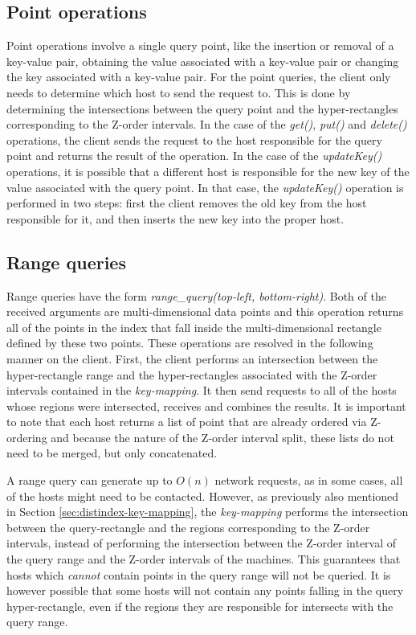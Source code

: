 \documentclass[11pt,a4paper]{globis-book}
\begin{document}
\subsection{Point operations}
Point operations involve a single query point, like the insertion or removal of a key-value pair, obtaining the value associated with a key-value pair or changing the key associated with a key-value pair. For the point queries, the client only needs to determine which host to send the request to. This is done by determining the intersections between the query point and the hyper-rectangles corresponding to the Z-order intervals. In the case of the \textit{get()}, \textit{put()} and \textit{delete()} operations, the client sends the request to the host responsible for the query point and returns the result of the operation. In the case of the \textit{updateKey()} operations, it is possible that a different host is responsible for the new key of the value associated with the query point. In that case, the \textit{updateKey()} operation is performed in two steps: first the client removes the old key from the host responsible for it, and then inserts the new key into the proper host.

\subsection{Range queries}

Range queries have the form \textit{range\_query(top-left, bottom-right)}. Both of the received arguments are multi-dimensional data points and this operation returns all of the points in the index that fall inside the multi-dimensional rectangle defined by these two points. These operations are resolved in the following manner on the client. First, the client performs an intersection between the hyper-rectangle range and the hyper-rectangles associated with the Z-order intervals contained in the \textit{key-mapping}. It then send requests to all of the hosts whose regions were intersected, receives and combines the results. It is important to note that each host returns a list of point that are already ordered via Z-ordering and because the nature of the Z-order interval split, these lists do not need to be merged, but only concatenated.

A range query can generate up to $O(n)$ network requests, as in some cases, all of the hosts might need to be contacted. However, as previously also mentioned in Section \ref{sec:distindex-key-mapping}, the \textit{key-mapping} performs the intersection between the query-rectangle and the regions corresponding to the Z-order intervals, instead of performing the intersection between the Z-order interval of the query range and the Z-order intervals of the machines. This guarantees that hosts which \textit{cannot} contain points in the query range will not be queried. It is however possible that some hosts will not contain any points falling in the query hyper-rectangle, even if the regions they are responsible for intersects with the query range.
\end{document}

